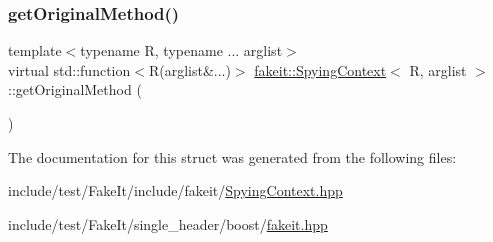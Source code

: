 \subsubsection{\texorpdfstring{getOriginalMethod()}{getOriginalMethod()}\hspace{0.1cm}{\footnotesize\ttfamily [9/9]}}
{\footnotesize\ttfamily template$<$typename R, typename ... arglist$>$ \\
virtual std\+::function$<$R(arglist\&...)$>$ \mbox{\hyperlink{structfakeit_1_1SpyingContext}{fakeit\+::\+Spying\+Context}}$<$ R, arglist $>$\+::get\+Original\+Method (\begin{DoxyParamCaption}{ }\end{DoxyParamCaption})\hspace{0.3cm}{\ttfamily [pure virtual]}}



The documentation for this struct was generated from the following files\+:\begin{DoxyCompactItemize}
\item 
include/test/\+Fake\+It/include/fakeit/\mbox{\hyperlink{SpyingContext_8hpp}{Spying\+Context.\+hpp}}\item 
include/test/\+Fake\+It/single\+\_\+header/boost/\mbox{\hyperlink{single__header_2boost_2fakeit_8hpp}{fakeit.\+hpp}}\end{DoxyCompactItemize}
